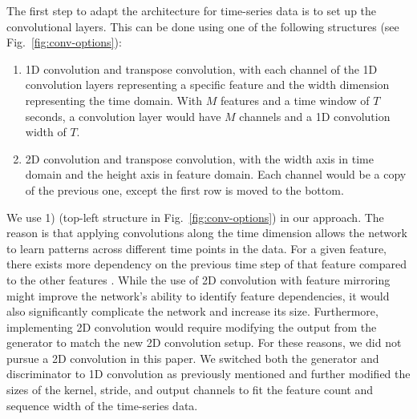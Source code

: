 The first step to adapt the architecture for time-series data is to set up the convolutional layers. This can be done using one of the following structures (see Fig.~\ref{fig:conv-options}):
%
\begin{enumerate}
    \item 1D convolution and transpose convolution, with each channel of the 1D convolution layers representing a specific feature and the width dimension representing the time domain. With $M$ features and a time window of $T$ seconds, a convolution layer would have $M$ channels and a 1D convolution width of $T$.
    \item 2D convolution and transpose convolution, with the width axis in time domain and the height axis in feature domain. Each channel would be a copy of the previous one, except the first row is moved to the bottom.
\end{enumerate}
%
We use 1) (top-left structure in Fig.~\ref{fig:conv-options}) in our approach. The reason is that applying convolutions along the time dimension allows the network to learn patterns across different time points in the data. For a given feature, there exists more dependency on the previous time step of that feature compared to the other features \cite{Ismail_Fawaz_2019}.
%
While the use of 2D convolution with feature mirroring might improve the network's ability to identify feature dependencies, it would also significantly complicate the network and increase its size. Furthermore, implementing 2D convolution would require modifying the output from the generator to match the new 2D convolution setup. For these reasons, we did not pursue a 2D convolution in this paper.
%
We switched both the generator and discriminator to 1D convolution as previously mentioned and further modified the sizes of the kernel, stride, and output channels to fit the feature count and sequence width of the time-series data. 



